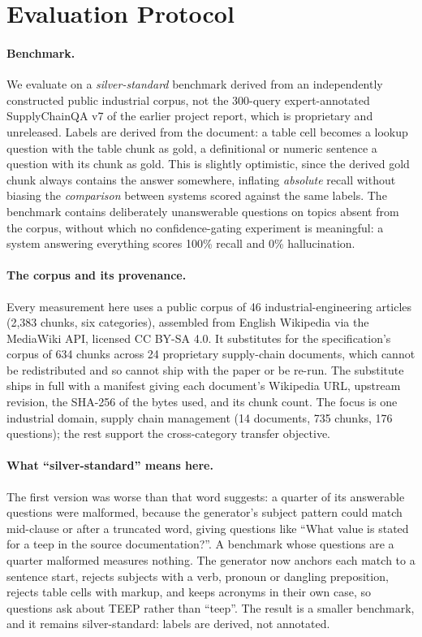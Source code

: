 \documentclass[conference]{IEEEtran}
\begin{document}
\section{Evaluation Protocol}
\label{sec:protocol}

\paragraph{Benchmark.} We evaluate on a \emph{silver-standard} benchmark
derived from an independently constructed public industrial corpus, not the
300-query expert-annotated SupplyChainQA v7 of the earlier project report,
which is proprietary and unreleased. Labels are derived from the document: a
table cell becomes a lookup question with the table chunk as gold, a
definitional or numeric sentence a question with its chunk as gold. This is
slightly optimistic, since the derived gold chunk always contains the answer
somewhere, inflating \emph{absolute} recall without biasing the
\emph{comparison} between systems scored against the same labels. The
benchmark contains deliberately unanswerable questions on topics absent from
the corpus, without which no confidence-gating experiment is meaningful: a
system answering everything scores 100\% recall and 0\% hallucination.

\paragraph{The corpus and its provenance.} Every measurement here uses a public
corpus of 46 industrial-engineering articles
(2{,}383 chunks, six categories), assembled from
English Wikipedia via the MediaWiki API, licensed CC BY-SA 4.0. It
substitutes for the specification's corpus of 634 chunks across 24
proprietary supply-chain documents, which cannot be redistributed and so
cannot ship with the paper or be re-run. The substitute ships in full with a
manifest giving each document's Wikipedia URL, upstream revision, the SHA-256
of the bytes used, and its chunk count. The focus is one industrial domain,
supply chain management (14 documents,
735 chunks, 176 questions); the rest
support the cross-category transfer objective.

\paragraph{What ``silver-standard'' means here.} The first version was worse
than that word suggests: a quarter of its answerable questions were malformed,
because the generator's subject pattern could match mid-clause or after a
truncated word, giving questions like
``What value is stated for a teep in the source documentation?''. A benchmark
whose questions are a quarter malformed measures nothing. The generator now
anchors each match to a sentence start, rejects subjects with a verb, pronoun
or dangling preposition, rejects table cells with markup, and keeps acronyms
in their own case, so questions ask about TEEP rather than ``teep''. The result
is a smaller benchmark, and it remains silver-standard: labels are derived,
not annotated.
\end{document}
